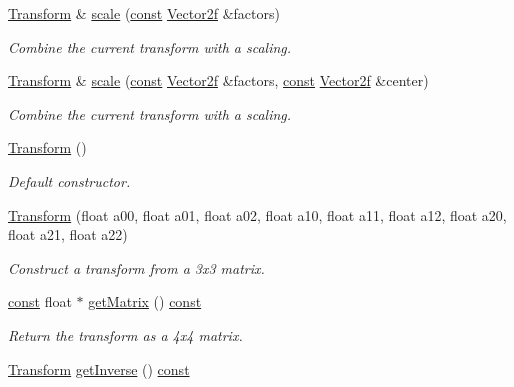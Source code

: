 \begin{DoxyCompactItemize}
\hyperlink{classsf_1_1_transform}{Transform} \& \hyperlink{classsf_1_1_transform_a3d57622a7ab309925c9d9887c99cc720}{scale} (\hyperlink{term__entry_8h_a57bd63ce7f9a353488880e3de6692d5a}{const} \hyperlink{namespacesf_a80cea3c46537294fd1d8d428566ad8b2}{Vector2f} \&factors)
\begin{DoxyCompactList}\small\item\em Combine the current transform with a scaling. \end{DoxyCompactList}\item 
\hyperlink{classsf_1_1_transform}{Transform} \& \hyperlink{classsf_1_1_transform_a9198da375173127901f3095e0165ee1b}{scale} (\hyperlink{term__entry_8h_a57bd63ce7f9a353488880e3de6692d5a}{const} \hyperlink{namespacesf_a80cea3c46537294fd1d8d428566ad8b2}{Vector2f} \&factors, \hyperlink{term__entry_8h_a57bd63ce7f9a353488880e3de6692d5a}{const} \hyperlink{namespacesf_a80cea3c46537294fd1d8d428566ad8b2}{Vector2f} \&center)
\begin{DoxyCompactList}\small\item\em Combine the current transform with a scaling. \end{DoxyCompactList}\item 
\hyperlink{classsf_1_1_transform_ac32de51bd0b9f3d52fbe0838225ee83b}{Transform} ()
\begin{DoxyCompactList}\small\item\em Default constructor. \end{DoxyCompactList}\item 
\hyperlink{classsf_1_1_transform_a78c48677712fcf41122d02f1301d71a3}{Transform} (float a00, float a01, float a02, float a10, float a11, float a12, float a20, float a21, float a22)
\begin{DoxyCompactList}\small\item\em Construct a transform from a 3x3 matrix. \end{DoxyCompactList}\item 
\hyperlink{term__entry_8h_a57bd63ce7f9a353488880e3de6692d5a}{const} float $\ast$ \hyperlink{classsf_1_1_transform_ae4c1969c47533e2b01deb526ff73b37f}{get\-Matrix} () \hyperlink{term__entry_8h_a57bd63ce7f9a353488880e3de6692d5a}{const} 
\begin{DoxyCompactList}\small\item\em Return the transform as a 4x4 matrix. \end{DoxyCompactList}\item 
\hyperlink{classsf_1_1_transform}{Transform} \hyperlink{classsf_1_1_transform_ab1c033198b0aae8cdb9daa3d3bef3fc1}{get\-Inverse} () \hyperlink{term__entry_8h_a57bd63ce7f9a353488880e3de6692d5a}{const} 

\end{DoxyCompactItemize}
